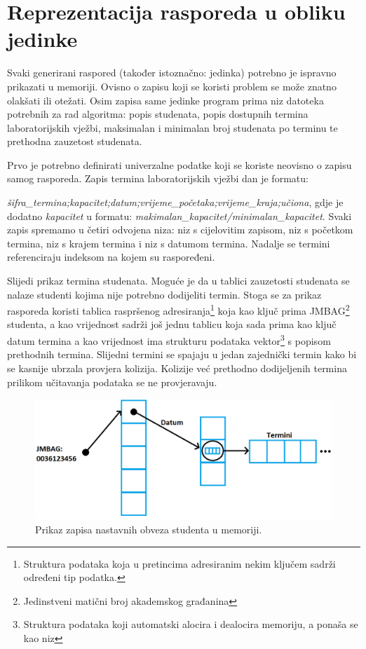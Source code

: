 \documentclass[times, utf8, zavrsni]{fer}
\begin{document}
\section{Reprezentacija rasporeda u obliku jedinke}

Svaki generirani raspored (također istoznačno: jedinka) potrebno je ispravno prikazati u memoriji. Ovisno o zapisu koji se koristi problem se može znatno olakšati ili otežati. Osim zapisa same jedinke program prima niz datoteka potrebnih za rad algoritma: popis studenata, popis dostupnih termina laboratorijskih vježbi, maksimalan i minimalan broj studenata po terminu te prethodna zauzetost studenata.

Prvo je potrebno definirati univerzalne podatke koji se koriste neovisno o zapisu samog rasporeda. Zapis termina laboratorijskih vježbi dan je formatu:

\emph{šifra\_termina;kapacitet;datum;vrijeme\_početaka;vrijeme\_kraja;učiona}, gdje je dodatno \emph{kapacitet} u formatu: \emph{makimalan\_kapacitet/minimalan\_kapacitet}. Svaki zapis spremamo u četiri odvojena niza: niz s cijelovitim zapisom, niz s početkom termina, niz s krajem termina i niz s datumom termina. Nadalje se termini referenciraju indeksom na kojem su raspoređeni.

Slijedi prikaz termina studenata. Moguće je da u tablici zauzetosti studenata se nalaze studenti kojima nije potrebno dodijeliti termin. Stoga se za prikaz rasporeda koristi tablica raspršenog adresiranja\footnote{Struktura podataka koja u pretincima adresiranim nekim ključem sadrži određeni tip podatka.} koja kao ključ prima JMBAG\footnote{Jedinstveni matični broj akademskog građanina} studenta, a kao vrijednost sadrži još jednu tablicu koja sada prima kao ključ datum termina a kao vrijednost ima strukturu podataka vektor\footnote{Struktura podataka koji automatski alocira i dealocira memoriju, a ponaša se kao niz} s popisom prethodnih termina. Slijedni termini se spajaju u jedan zajednički termin kako bi se kasnije ubrzala provjera kolizija. Kolizije već prethodno dodijeljenih termina prilikom učitavanja podataka se ne provjeravaju.

\begin{figure}[htb]
\centering
\includegraphics[width=15cm]{images/prikaz_termina.png}
\caption{Prikaz zapisa nastavnih obveza studenta u memoriji.}
\label{fig:prikaz_termina}
\end{figure}
\end{document}
